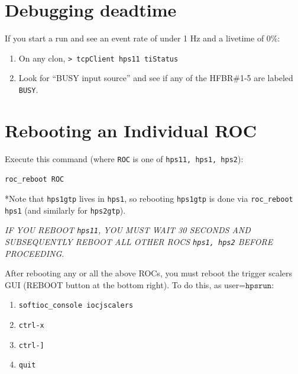 \documentclass[12pt]{article}
\begin{document}
\section{Debugging deadtime}
%
%
%
%

If you start a run and see an event rate of under 1 Hz and a livetime of 0\%:
\begin{enumerate}
\item On any clon,\newline
\texttt{> tcpClient hps11 tiStatus}\newline
\item Look for ``BUSY input source'' and see if any of the HFBR\#1-5 are labeled \texttt{BUSY}.

\end{enumerate}

\section{Rebooting an Individual ROC}\label{sec:rebootaroc}
Execute this command (where \texttt{ROC} is one of \texttt{hps11, hps1, hps2}):\newline
\centerline{\texttt{roc\_reboot ROC}}

\vspace{5mm}\noindent
*Note that \texttt{hps1gtp} lives in \texttt{hps1}, so rebooting \texttt{hps1gtp} is done via \texttt{roc\_reboot hps1} (and similarly for \texttt{hps2gtp}).

\vspace{5mm}\noindent
{\em IF YOU REBOOT \texttt{hps11}, YOU MUST WAIT 30 SECONDS AND SUBSEQUENTLY REBOOT ALL OTHER ROCS \texttt{hps1, hps2} BEFORE PROCEEDING}.

After rebooting any or all the above ROCs, you must reboot the trigger scalers GUI (REBOOT button at the bottom right).  To do this, as user=$\texttt{hpsrun}$:
    \begin{enumerate}
      \item    \texttt{softioc\_console iocjscalers}
      \item    \texttt{ctrl-x}
      \item    \texttt{ctrl-]}
      \item    \texttt{quit}
    \end{enumerate}
        
\end{document}
